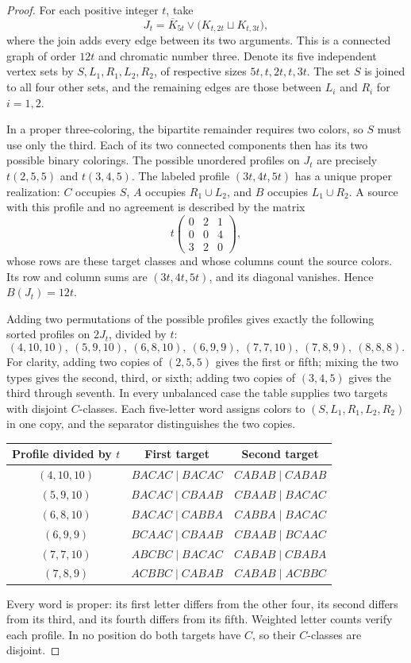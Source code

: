 \documentclass[10pt,a4paper]{amsart}
\numberwithin{equation}{section}
\theoremstyle{definition}
\theoremstyle{remark}
\begin{document}
\begin{proof}
For each positive integer $t$, take
\[
 J_t=\overline K_{5t}\vee
       \bigl(K_{t,2t}\sqcup K_{t,3t}\bigr),
\]
where the join adds every edge between its two arguments.
This is a connected graph of order $12t$ and chromatic number three.
Denote its five independent vertex sets by
$S,L_1,R_1,L_2,R_2$, of respective sizes $5t,t,2t,t,3t$.
The set $S$ is joined to all four other sets, and the remaining edges
are those between $L_i$ and $R_i$ for $i=1,2$.

In a proper three-coloring, the bipartite remainder requires two colors,
so $S$ must use only the third. Each of its two connected components
then has its two possible binary colorings. The possible unordered
profiles on $J_t$ are precisely $t(2,5,5)$ and $t(3,4,5)$.
The labeled profile $(3t,4t,5t)$ has a unique proper realization:
$C$ occupies $S$, $A$ occupies $R_1\cup L_2$, and $B$ occupies
$L_1\cup R_2$. A source with this profile and no agreement is described
by the matrix
\[
 t\begin{pmatrix}0&2&1\\0&0&4\\3&2&0\end{pmatrix},
\]
whose rows are these target classes and whose columns count the source
colors. Its row and column sums are $(3t,4t,5t)$, and its diagonal
vanishes. Hence $B(J_t)=12t$.

Adding two permutations of the possible profiles gives exactly the
following sorted profiles on $2J_t$, divided by $t$:
\[
 (4,10,10),\ (5,9,10),\ (6,8,10),\ (6,9,9),\
 (7,7,10),\ (7,8,9),\ (8,8,8).
\]
For clarity, adding two copies of $(2,5,5)$ gives the first or fifth;
mixing the two types gives the second, third, or sixth; adding two
copies of $(3,4,5)$ gives the third through seventh.
In every unbalanced case the table supplies two targets with disjoint
$C$-classes. Each five-letter word assigns colors to
$(S,L_1,R_1,L_2,R_2)$ in one copy, and the separator distinguishes
the two copies.
\begin{center}
\begin{tabular}{c@{\qquad}c@{\qquad}c}
\toprule
Profile divided by $t$ & First target & Second target\\
\midrule
$(4,10,10)$ & $BACAC\mid BACAC$ & $CABAB\mid CABAB$\\
$(5,9,10)$ & $BACAC\mid CBAAB$ & $CBAAB\mid BACAC$\\
$(6,8,10)$ & $BACAC\mid CABBA$ & $CABBA\mid BACAC$\\
$(6,9,9)$ & $BCAAC\mid CBAAB$ & $CBAAB\mid BCAAC$\\
$(7,7,10)$ & $ABCBC\mid BACAC$ & $CABAB\mid CBABA$\\
$(7,8,9)$ & $ACBBC\mid CABAB$ & $CABAB\mid ACBBC$\\
\bottomrule
\end{tabular}
\end{center}
Every word is proper: its first letter differs from the other four,
its second differs from its third, and its fourth differs from its
fifth. Weighted letter counts verify each profile. In no position
do both targets have $C$, so their $C$-classes are disjoint.


\end{proof}
\end{document}
